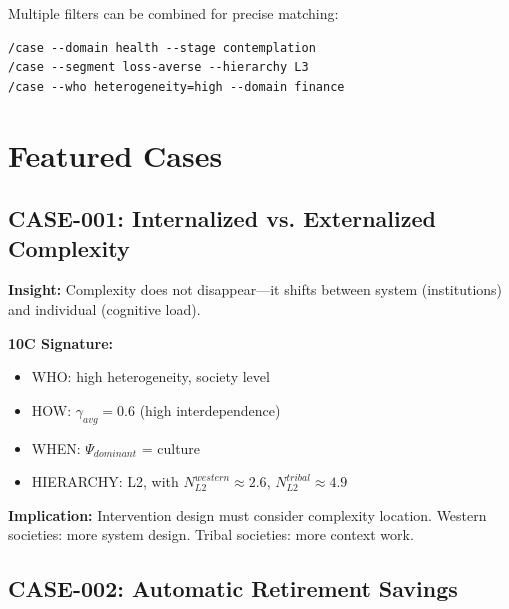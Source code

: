 Multiple filters can be combined for precise matching:

\begin{verbatim}
/case --domain health --stage contemplation
/case --segment loss-averse --hierarchy L3
/case --who heterogeneity=high --domain finance
\end{verbatim}

\section{Featured Cases}

\subsection{CASE-001: Internalized vs. Externalized Complexity}

\begin{tcolorbox}[colback=yellow!5, colframe=yellow!50, title=Cross-Cultural Complexity]
\textbf{Insight:} Complexity does not disappear---it shifts between system (institutions) and individual (cognitive load).

\textbf{10C Signature:}
\begin{itemize}
    \item WHO: high heterogeneity, society level
    \item HOW: $\gamma_{avg} = 0.6$ (high interdependence)
    \item WHEN: $\Psi_{dominant}$ = culture
    \item HIERARCHY: L2, with $N_{L2}^{western} \approx 2.6$, $N_{L2}^{tribal} \approx 4.9$
\end{itemize}

\textbf{Implication:} Intervention design must consider complexity location. Western societies: more system design. Tribal societies: more context work.
\end{tcolorbox}

\subsection{CASE-002: Automatic Retirement Savings}

